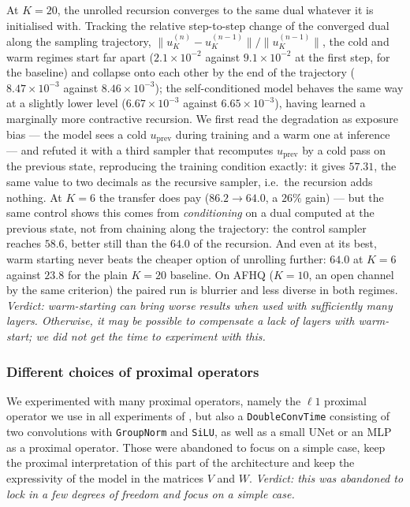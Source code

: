 \documentclass[a4paper,11pt]{article}
\theoremstyle{plain}{\theorembodyfont{\rmfamily}%
\newtheorem{proposition}[theorem]{Proposition}}
\theoremstyle{plain}{\theorembodyfont{\rmfamily}%
\newtheorem{notation}[theorem]{Notation}}
\theoremstyle{plain}{\theorembodyfont{\rmfamily}%
\newtheorem{assumption}[theorem]{Assumption}}
\theoremstyle{plain}{\theorembodyfont{\rmfamily}%
\newtheorem{problem}[theorem]{Problem}}
\theoremstyle{plain}{\theorembodyfont{\rmfamily}%
\newtheorem{example}[theorem]{Example}}
\theoremstyle{plain}{\theorembodyfont{\rmfamily}%
\newtheorem{remark}[theorem]{Remark}}
\theoremstyle{plain}{\theorembodyfont{\rmfamily}%
\newtheorem{definition}[theorem]{Definition}}
\theoremstyle{plain}{\theorembodyfont{\rmfamily}%
\newtheorem{question}[theorem]{Question}}
\numberwithin{equation}{section}
\begin{document}
At $K=20$, the unrolled recursion converges to
the same dual whatever it is initialised with. Tracking the relative step-to-step
change of the converged dual along the sampling trajectory,
$\|u_K^{(n)}-u_K^{(n-1)}\|/\|u_K^{(n-1)}\|$, the cold and warm regimes start far
apart ($2.1\times10^{-2}$ against $9.1\times10^{-2}$ at the first step, for the
baseline) and collapse onto each other by the end of the trajectory
($8.47\times10^{-3}$ against $8.46\times10^{-3}$); the self-conditioned model
behaves the same way at a slightly lower level ($6.67\times10^{-3}$ against
$6.65\times10^{-3}$), having learned a marginally more contractive recursion. We
first read the degradation as exposure bias --- the model sees a cold $u_{\text{prev}}$ during training and a warm one at
inference --- and refuted it with a third sampler that recomputes $u_{\text{prev}}$
by a cold pass on the previous state, reproducing the training condition exactly:
it gives $57.31$, the same value to two decimals as the recursive sampler, i.e.\
the recursion adds nothing. At $K=6$ the transfer does pay ($86.2 \to 64.0$, a
$26\%$ gain) --- but the same control shows this comes from \emph{conditioning} on
a dual computed at the previous state, not from chaining along the trajectory:
the control sampler reaches $58.6$, better still than the $64.0$ of the recursion.
And even at its best, warm starting never beats the cheaper option of unrolling
further: $64.0$ at $K=6$
against $23.8$ for the plain $K=20$ baseline. On AFHQ ($K=10$, an open channel by
the same criterion) the paired run is blurrier and less diverse in both regimes.
\emph{Verdict: warm-starting can bring worse results when used with sufficiently many layers. Otherwise, it may be possible to compensate a lack of layers with warm-start; we did not get the time to experiment with this.}

\subsubsection{Different choices of proximal operators}
\label{subsec:proximaloperators}

We experimented with many proximal operators, namely the $\ell1$ proximal operator we use in all experiments of , but also a \verb|DoubleConvTime| consisting of two convolutions with \verb|GroupNorm| and \verb|SiLU|, as well as a small UNet or an MLP as a proximal operator. Those were abandoned to focus on a simple case, keep the proximal interpretation of this part of the architecture and keep the expressivity of the model in the matrices $V$ and $W$. \emph{Verdict: this was abandoned to lock in a few degrees of freedom and focus on a simple case.}
\end{document}
